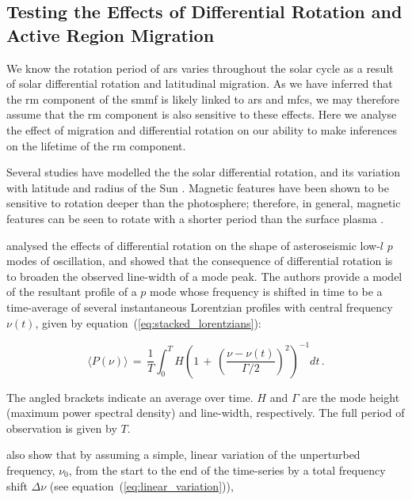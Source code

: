  
\subsection{Testing the Effects of Differential Rotation and Active Region Migration}
\label{sec:smearing}

We know the rotation period of \glspl{ar} varies throughout the solar cycle as a result of solar differential rotation and latitudinal migration. As we have inferred that the \gls{rm} component of the \gls{smmf} is likely linked to \glspl{ar} and \glspl{mfc}, we may therefore assume that the \gls{rm} component is also sensitive to these effects. Here we analyse the effect of migration and differential rotation on our ability to make inferences on the lifetime of the \gls{rm} component.

Several studies have modelled the the solar differential rotation, and its variation with latitude and radius of the Sun \citep[see][for an in depth review of the literature on solar differential rotation]{beck_comparison_2000, howe_solar_2009}. Magnetic features have been shown to be sensitive to rotation deeper than the photosphere; therefore, in general, magnetic features can be seen to rotate with a shorter period than the surface plasma \citep{howe_solar_2009}.

\citet{chaplin_distortion_2008} analysed the effects of differential rotation on the shape of asteroseismic low-$l$ $p$ modes of oscillation, and showed that the consequence of differential rotation is to broaden the observed line-width of a mode peak. The authors provide a model of the resultant profile of a $p$ mode whose frequency is shifted in time to be a time-average of several instantaneous Lorentzian profiles with central frequency $\nu(t)$, given by equation~(\ref{eq:stacked_lorentzians}):

\begin{equation}
\langle P(\nu) \rangle \, = \, \frac{1}{T} \int^T_0 H \left( 1 \, + \, \left( \frac{\nu - \nu(t)}{\Gamma /2} \right)^2 \right)^{-1} dt \, .
\label{eq:stacked_lorentzians}
\end{equation}

The angled brackets indicate an average over time. $H$ and $\Gamma$ are the mode height (maximum power spectral density) and line-width, respectively. The full period of observation is given by $T$.

\citet{chaplin_distortion_2008} also show that by assuming a simple, linear variation of the unperturbed frequency, $\nu_0$, from the start to the end of the time-series by a total frequency shift $\Delta\nu$ (see equation~(\ref{eq:linear_variation})),

